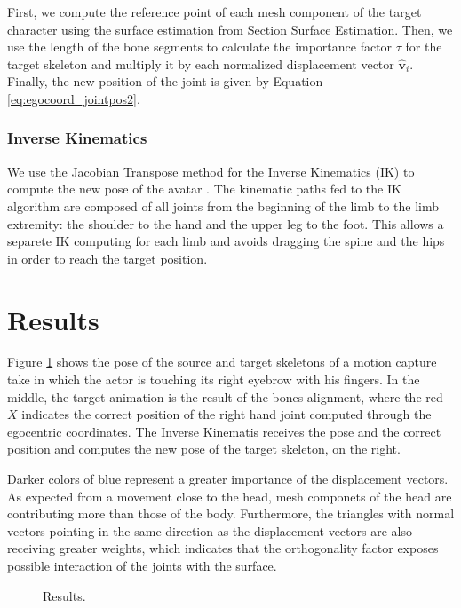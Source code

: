 \documentclass{vgtc}
\begin{document}
First, we compute the reference point of each mesh component of the
target character using the surface estimation from Section Surface
Estimation. Then, we use the length of the bone segments to calculate
the importance factor \(\tau\) for the target skeleton and multiply it
by each normalized displacement vector \(\mathbf{\hat{v}}_{i}\).
Finally, the new position of the joint is given by Equation
\ref{eq:egocoord_jointpos2}.

\subsubsection{Inverse Kinematics}\label{inverse-kinematics}

We use the Jacobian Transpose method for the Inverse Kinematics (IK) to
compute the new pose of the avatar \cite{buss}. The kinematic paths fed
to the IK algorithm are composed of all joints from the beginning of the
limb to the limb extremity: the shoulder to the hand and the upper leg
to the foot. This allows a separete IK computing for each limb and
avoids dragging the spine and the hips in order to reach the target
position.

    \section{Results}\label{results}

Figure \ref{fig:result1} shows the pose of the source and target
skeletons of a motion capture take in which the actor is touching its
right eyebrow with his fingers. In the middle, the target animation is
the result of the bones alignment, where the red \(X\) indicates the
correct position of the right hand joint computed through the egocentric
coordinates. The Inverse Kinematis receives the pose and the correct
position and computes the new pose of the target skeleton, on the right.

Darker colors of blue represent a greater importance of the displacement
vectors. As expected from a movement close to the head, mesh componets
of the head are contributing more than those of the body. Furthermore,
the triangles with normal vectors pointing in the same direction as the
displacement vectors are also receiving greater weights, which indicates
that the orthogonality factor exposes possible interaction of the joints
with the surface.


    \captionsetup{labelformat=default}
    \begin{figure}
        \begin{center}\end{center}
        \caption{Results.}
        \label{fig:result1}
    \end{figure}
    
\end{document}
